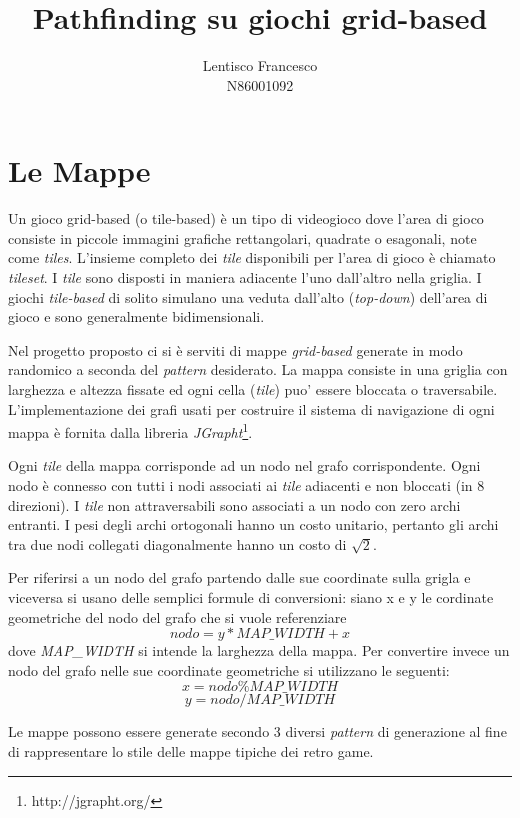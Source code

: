 \documentclass[11pt]{article}
\title{\textbf{Pathfinding su giochi grid-based}}
\author{Lentisco Francesco\\
N86001092}
\date{}
\begin{document}
\maketitle

\section{Le Mappe}

Un gioco grid-based (o tile-based) \`e un tipo di videogioco dove l'area di gioco consiste in piccole immagini grafiche rettangolari, quadrate o esagonali, note come \emph{tiles}. L'insieme completo dei \emph{tile} disponibili per l'area di gioco \`e chiamato \emph{tileset}. I \emph{tile} sono disposti in maniera adiacente l'uno dall'altro nella griglia. I giochi \emph{tile-based} di solito simulano una veduta dall'alto (\emph{top-down}) dell'area di gioco e sono generalmente bidimensionali. \par Nel progetto proposto ci si \`e serviti di mappe \emph{grid-based} generate in modo randomico a seconda del \emph{pattern} desiderato. La mappa consiste in una griglia con larghezza e altezza fissate ed ogni cella (\emph{tile}) puo' essere bloccata o traversabile. L'implementazione dei grafi usati per costruire il sistema di navigazione di ogni mappa \`e fornita dalla libreria \emph{JGrapht}\footnote{http://jgrapht.org/}. \par Ogni \emph{tile} della mappa corrisponde ad un nodo nel grafo corrispondente. Ogni nodo \`e connesso con tutti i nodi associati ai \emph{tile} adiacenti e non bloccati (in 8 direzioni). I \emph{tile} non attraversabili sono associati a un nodo con zero archi entranti. I pesi degli archi ortogonali hanno un costo unitario, pertanto gli archi tra due nodi collegati diagonalmente hanno un costo di $\sqrt{2}$. \par Per riferirsi a un nodo del grafo partendo dalle sue coordinate sulla grigla e viceversa si usano delle semplici formule di conversioni:
siano x e y le cordinate geometriche del nodo del grafo che si vuole referenziare\begin{equation} nodo = y*MAP\_WIDTH + x \end{equation} dove \emph{MAP\_WIDTH} si intende la larghezza della mappa. Per convertire invece un nodo del grafo nelle sue coordinate geometriche si utilizzano le seguenti: \begin{equation} x = nodo \% MAP\_WIDTH \end{equation} \begin{equation} y = nodo / MAP\_WIDTH \end{equation} \par Le mappe possono essere generate secondo 3 diversi \emph{pattern} di generazione al fine di rappresentare lo stile delle mappe tipiche dei retro game.
\end{document}
